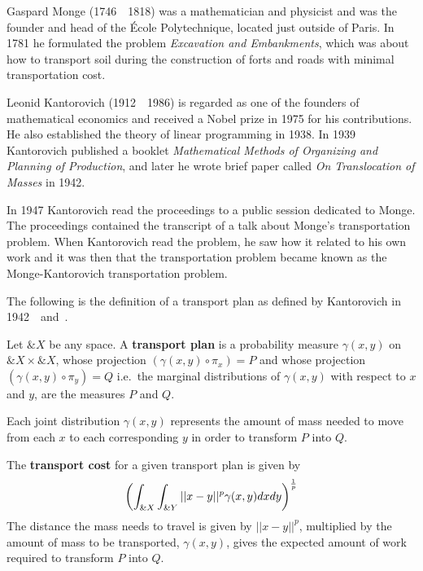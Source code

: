 Gaspard Monge (1746~\textendash~1818) was a mathematician and physicist and was
the founder and head of the \'Ecole Polytechnique, located just
outside of Paris. In 1781 he formulated the problem \textit{Excavation
  and Embankments}, which was about how to transport soil during the
construction of forts and roads with minimal transportation cost.

Leonid Kantorovich (1912~\textendash~1986) is regarded as one of the founders of
mathematical economics and received a Nobel prize in 1975 for his
contributions.  He also established the theory of linear programming
in 1938. In 1939 Kantorovich published a booklet \textit{Mathematical
  Methods of Organizing and Planning of Production}, and later he wrote
brief paper called \textit{On Translocation of Masses} in 1942.

In 1947 Kantorovich read the proceedings to a public session dedicated
to Monge.  The proceedings contained the transcript of a talk about
Monge's transportation problem. When Kantorovich read the problem, he
saw how it related to his own work and it was then that the
transportation problem became known as the Monge-Kantorovich
transportation problem.

The following is the definition of a transport plan as defined by
Kantorovich in 1942~\cite{ref:kantorovich-1942}~and~\cite{ref:vershik-2013}.

\begin{definition}
  Let $\&X$ be any space. A \textbf{transport plan} is a probability
  measure $\gamma(x, y)$ on $\&X \times \&X$, whose projection
  $(\gamma(x, y) \circ \pi_{x}) = P$ and whose projection
  $(\gamma(x, y) \circ \pi_{y}) = Q$ i.e.\ the marginal distributions
  of $\gamma(x, y)$ with respect to $x$ and $y$, are the measures $P$
  and $Q$.
\end{definition}

\begin{remark}
  Each joint distribution $\gamma(x, y)$ represents the amount of mass
  needed to move from each $x$ to each corresponding $y$ in order to
  transform $P$ into $Q$.
\end{remark}

\begin{definition}
  The \textbf{transport cost} for a given transport plan is given by
  \begin{align}
    \label{eq:expected-work}
    \left(\int_{\&X}\int_{\&Y}||x-y||^p\gamma(x, y)dxdy \right)^{1 \over p}
  \end{align}
  The distance the mass needs to travel is given by $||x-y||^p$,
  multiplied by the amount of mass to be transported, $\gamma(x, y)$,
  gives the expected amount of work required to transform $P$ into
  $Q$.
\end{definition}

